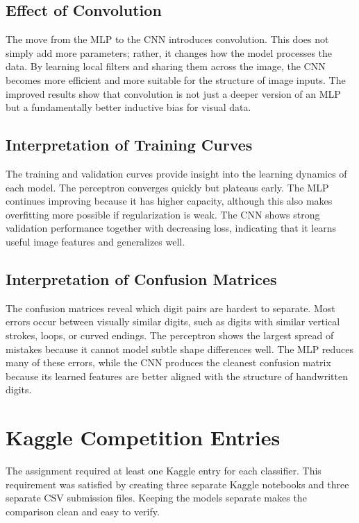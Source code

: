 \documentclass[11pt]{article}
\begin{document}
\subsection{Effect of Convolution}

The move from the MLP to the CNN introduces convolution. This does not simply add more parameters; rather, it changes how the model processes the data. By learning local filters and sharing them across the image, the CNN becomes more efficient and more suitable for the structure of image inputs. The improved results show that convolution is not just a deeper version of an MLP but a fundamentally better inductive bias for visual data.

\subsection{Interpretation of Training Curves}

The training and validation curves provide insight into the learning dynamics of each model. The perceptron converges quickly but plateaus early. The MLP continues improving because it has higher capacity, although this also makes overfitting more possible if regularization is weak. The CNN shows strong validation performance together with decreasing loss, indicating that it learns useful image features and generalizes well.

\subsection{Interpretation of Confusion Matrices}

The confusion matrices reveal which digit pairs are hardest to separate. Most errors occur between visually similar digits, such as digits with similar vertical strokes, loops, or curved endings. The perceptron shows the largest spread of mistakes because it cannot model subtle shape differences well. The MLP reduces many of these errors, while the CNN produces the cleanest confusion matrix because its learned features are better aligned with the structure of handwritten digits.

\section{Kaggle Competition Entries}

The assignment required at least one Kaggle entry for each classifier. This requirement was satisfied by creating three separate Kaggle notebooks and three separate CSV submission files. Keeping the models separate makes the comparison clean and easy to verify.
\end{document}
